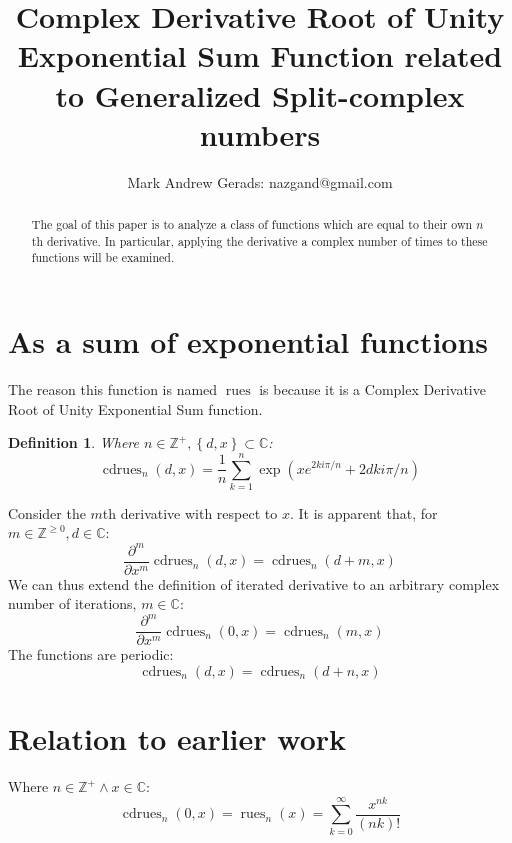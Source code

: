 \documentclass[]{article}
\author{Mark Andrew Gerads: nazgand@gmail.com}
\title{Complex Derivative Root of Unity Exponential Sum Function related to Generalized Split-complex numbers}
\DeclareMathOperator{\rues}{rues}
\DeclareMathOperator{\cdrues}{cdrues}
\newcommand{\pqty}[1]{{\left(#1\right)}}
\newcommand{\Bqty}[1]{{\left\{#1\right\}}}
\newcommand{\pdiff}[2]{\frac{\partial^{#2}}{\partial #1^{#2}}}
\newtheorem{definition}[theorem]{Definition}
\numberwithin{equation}{section}
\begin{document}
	
	\maketitle
	
	\begin{abstract}
		The goal of this paper is to analyze a class of functions which are equal to their own \(n\)th derivative. In particular, applying the derivative a complex number of times to these functions will be examined.
	\end{abstract}
	
	\section{As a sum of exponential functions}
	The reason this function is named $\rues$ is because it is a Complex Derivative Root of Unity Exponential Sum function.
	\begin{definition}
		Where $n\in\mathbb{Z}^+,\Bqty{d,x}\subset\mathbb{C}$:
		\begin{equation}
		\label{cdrues Exponential sum form}
		\cdrues_n\pqty{d,x}=
		\frac{1}{n}\sum _{k=1}^n \exp\pqty{xe^{2ki\pi/n}+2dki\pi/n}
		\end{equation}
	\end{definition}
	Consider the $m$th derivative with respect to $x$. It is apparent that, for $m\in\mathbb{Z}^{\geq 0},d\in\mathbb{C}$:
	\begin{equation}
	\pdiff{x}{m}\cdrues_n\pqty{d,x}=\cdrues_n\pqty{d+m,x}
	\end{equation}
	We can thus extend the definition of iterated derivative to an arbitrary complex number of iterations, $m\in\mathbb{C}$:
	\begin{equation}
	\pdiff{x}{m}\cdrues_n\pqty{0,x}=\cdrues_n\pqty{m,x}
	\end{equation}
	The functions are periodic:
	\begin{equation}
	\cdrues_n\pqty{d,x}=\cdrues_n\pqty{d+n,x}
	\end{equation}
	
	\section{Relation to earlier work}
	Where \(n\in\mathbb{Z}^+\land x\in\mathbb{C}\):
	\begin{equation}
	\cdrues_n\pqty{0,x}=
	\rues_n\pqty{x}=
	\sum_{k=0}^{\infty}\frac{x^{nk}}{\pqty{nk}!}
	\end{equation}
\end{document}
